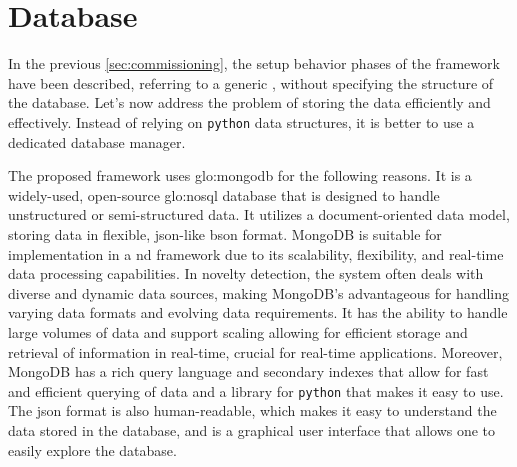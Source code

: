 
\section{Database}
\label{sec:Database}
In the previous \autoref{sec:commissioning}, the setup behavior phases of the framework have been described, referring to a generic , without specifying the structure of the database. Let's now address the problem of storing the data efficiently and effectively. Instead of relying on \texttt{python} data structures, it is better to use a dedicated database manager.

The proposed framework uses \gls{glo:mongodb} for the following reasons. It is a widely-used, open-source \gls{glo:nosql} database that is designed to handle unstructured or semi-structured data. It utilizes a document-oriented data model, storing data in flexible, \gls{json}-like \gls{bson} format. MongoDB is suitable for implementation in a \gls{nd} framework due to its scalability, flexibility, and real-time data processing capabilities. In novelty detection, the system often deals with diverse and dynamic data sources, making MongoDB's  advantageous for handling varying data formats and evolving data requirements. It has the ability to handle large volumes of data and support scaling allowing for efficient storage and retrieval of information in real-time, crucial for real-time applications. Moreover, MongoDB has a rich query language and secondary indexes that allow for fast and efficient querying of data and a library for \texttt{python} that makes it easy to use.
The \gls{json} format is also human-readable, which makes it easy to understand the data stored in the database, and  is a graphical user interface that allows one to easily explore the database.

